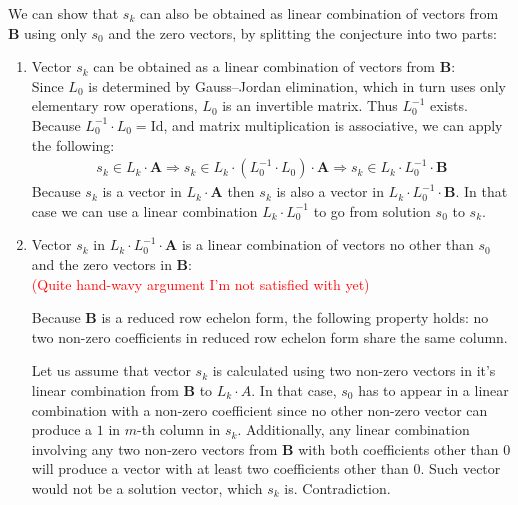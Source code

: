 \begin{description}
    We can show that $s_k$ can also be obtained as linear combination of vectors from $\boldsymbol{B}$ using only $s_0$ and the zero vectors, by splitting the conjecture into two parts:
    \begin{enumerate}
    \item Vector $s_k$ can be obtained as a linear combination of vectors from $\boldsymbol{B}$: \hfill \\
        Since $L_0$ is determined by Gauss--Jordan elimination, which in turn uses only elementary row operations, $L_0$ is an invertible matrix.
        Thus $L_0^{-1}$ exists. Because $L_0^{-1} \cdot L_0 = \mbox{Id}$, and matrix multiplication is associative, we can apply the following:
        \begin{equation}
        \begin{matrix}
            s_k \in L_k \cdot \boldsymbol{A} \Rightarrow s_k \in L_k \cdot (L_0^{-1} \cdot L_0) \cdot \boldsymbol{A} \Rightarrow s_k \in L_k \cdot L_0^{-1} \cdot \boldsymbol{B}
        \end{matrix}
        \end{equation}
        Because $s_k$ is a vector in $L_k \cdot \boldsymbol{A}$ then $s_k$ is also a vector in $L_k \cdot L_0^{-1} \cdot \boldsymbol{B}$.
        In that case we can use a linear combination $L_k \cdot L_0^{-1}$ to go from solution $s_0$ to $s_k$.

    \item Vector $s_k$ in $L_k \cdot L_0^{-1} \cdot \boldsymbol{A}$ is a linear combination of vectors no other than $s_0$ and the zero vectors in $\boldsymbol{B}$:\hfill \\
        \textcolor{red}{(Quite hand-wavy argument I'm not satisfied with yet)}

        Because $\boldsymbol{B}$ is a reduced row echelon form, the following property holds: no two non-zero coefficients in reduced row echelon form share the same column.

        Let us assume that vector $s_k$ is calculated using two non-zero vectors in it's linear combination from $\boldsymbol{B}$ to $L_k \cdot A$.
        In that case, $s_0$ has to appear in a linear combination with a non-zero coefficient since no other non-zero vector can produce a $1$ in $m$-th column in $s_k$.
        Additionally, any linear combination involving any two non-zero vectors from $\boldsymbol{B}$ with both coefficients other than $0$ will produce a vector with at least two coefficients other than $0$.
        Such vector would not be a solution vector, which $s_k$ is. Contradiction.
    \end{enumerate}
\end{description}

